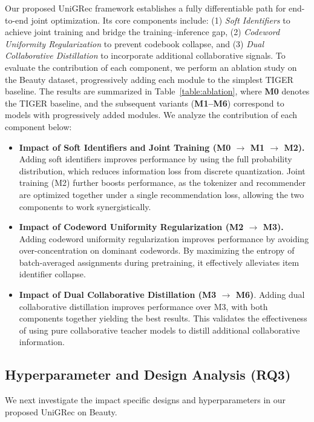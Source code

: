 Our proposed {UniGRec} framework establishes a fully differentiable path for end-to-end joint optimization. Its core components include: (1) \textit{Soft Identifiers} to achieve joint training and bridge the training–inference gap, (2) \textit{Codeword Uniformity Regularization} to prevent codebook collapse, and (3) \textit{Dual Collaborative Distillation} to incorporate additional collaborative signals. To evaluate the contribution of each component, we perform an ablation study on the Beauty dataset, progressively adding each module to the simplest TIGER baseline.
The results are summarized in Table~\ref{table:ablation}, where \textbf{M0} denotes the TIGER baseline, and the subsequent variants (\textbf{M1–M6}) correspond to models with progressively added modules. We analyze the contribution of each component below:
\begin{itemize}[leftmargin=*]
    \item \textbf{Impact of Soft Identifiers and Joint Training (M0 $\rightarrow$ M1 $\rightarrow$ M2).} Adding soft identifiers improves performance by using the full probability distribution, which reduces information loss from discrete quantization. Joint training (M2) further boosts performance, as the tokenizer and recommender are optimized together under a single recommendation loss, allowing the two components to work synergistically.
    \item \textbf{Impact of Codeword Uniformity Regularization (M2 $\rightarrow$ M3).} Adding codeword uniformity regularization improves performance by avoiding over-concentration on dominant codewords. By maximizing the entropy of batch-averaged assignments during pretraining, it effectively alleviates item identifier collapse.
    \item \textbf{Impact of Dual Collaborative Distillation (M3 $\rightarrow$ M6)}. Adding dual collaborative distillation improves performance over M3, with both components together yielding the best results. This validates the effectiveness of using pure collaborative teacher models to distill additional collaborative information.
\end{itemize}


\subsection{Hyperparameter and Design Analysis (RQ3)}
\label{sec:hyper_param}


We next investigate the impact specific designs and hyperparameters in our proposed UniGRec on Beauty. 

